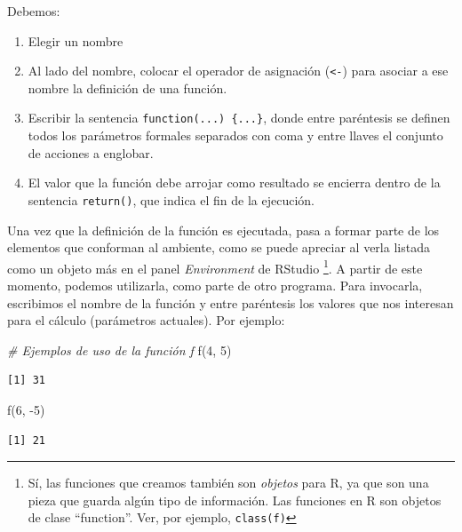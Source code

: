 \documentclass[
]{book}
\newenvironment{Shaded}{\begin{snugshade}}{\end{snugshade}}
\newcommand{\CommentTok}[1]{\textcolor[rgb]{0.56,0.35,0.01}{\textit{#1}}}
\newcommand{\DecValTok}[1]{\textcolor[rgb]{0.00,0.00,0.81}{#1}}
\newcommand{\FunctionTok}[1]{\textcolor[rgb]{0.00,0.00,0.00}{#1}}
\newcommand{\NormalTok}[1]{#1}
\newcommand{\SpecialCharTok}[1]{\textcolor[rgb]{0.00,0.00,0.00}{#1}}
\providecommand{\tightlist}{%
  \setlength{\itemsep}{0pt}\setlength{\parskip}{0pt}}
\begin{document}
Debemos:

\begin{enumerate}
\def\labelenumi{\arabic{enumi}.}
\tightlist
\item
  Elegir un nombre
\item
  Al lado del nombre, colocar el operador de asignación (\texttt{\textless{}-}) para asociar a ese nombre la definición de una función.
\item
  Escribir la sentencia \texttt{function(...)\ \{...\}}, donde entre paréntesis se definen todos los parámetros formales separados con coma y entre llaves el conjunto de acciones a englobar.
\item
  El valor que la función debe arrojar como resultado se encierra dentro de la sentencia \texttt{return()}, que indica el fin de la ejecución.
\end{enumerate}

Una vez que la definición de la función es ejecutada, pasa a formar parte de los elementos que conforman al ambiente, como se puede apreciar al verla listada como un objeto más en el panel \emph{Environment} de RStudio \footnote{Sí, las funciones que creamos también son \emph{objetos} para R, ya que son una pieza que guarda algún tipo de información. Las funciones en R son objetos de clase ``function''. Ver, por ejemplo, \texttt{class(f)}}. A partir de este momento, podemos utilizarla, como parte de otro programa. Para invocarla, escribimos el nombre de la función y entre paréntesis los valores que nos interesan para el cálculo (parámetros actuales). Por ejemplo:

\begin{Shaded}
\begin{Highlighting}[]
\CommentTok{\# Ejemplos de uso de la función f}
\FunctionTok{f}\NormalTok{(}\DecValTok{4}\NormalTok{, }\DecValTok{5}\NormalTok{)}
\end{Highlighting}
\end{Shaded}

\begin{verbatim}
[1] 31
\end{verbatim}

\begin{Shaded}
\begin{Highlighting}[]
\FunctionTok{f}\NormalTok{(}\DecValTok{6}\NormalTok{, }\SpecialCharTok{{-}}\DecValTok{5}\NormalTok{)}
\end{Highlighting}
\end{Shaded}

\begin{verbatim}
[1] 21
\end{verbatim}
\end{document}
